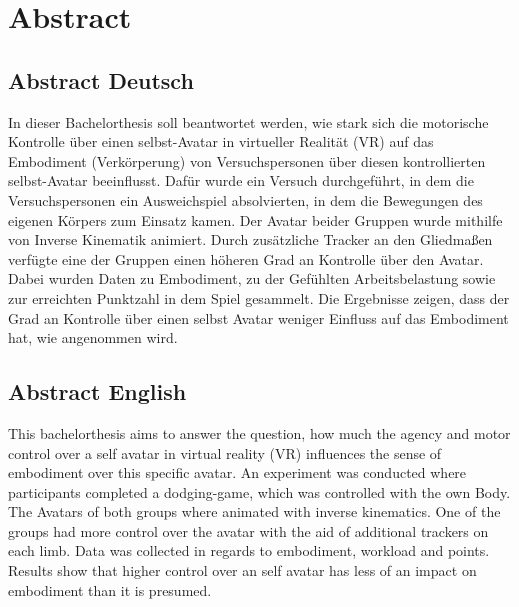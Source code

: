 \chapter*{Abstract}

\section*{Abstract Deutsch}
In dieser Bachelorthesis soll beantwortet werden, wie stark sich die motorische Kontrolle über einen selbst-Avatar in virtueller Realität (VR) auf das Embodiment (Verkörperung) von Versuchspersonen über diesen kontrollierten selbst-Avatar beeinflusst. Dafür wurde ein Versuch durchgeführt, in dem die Versuchspersonen ein Ausweichspiel absolvierten, in dem die Bewegungen des eigenen Körpers zum Einsatz kamen. Der Avatar beider Gruppen wurde mithilfe von Inverse Kinematik animiert. Durch zusätzliche Tracker an den Gliedmaßen verfügte eine der Gruppen einen höheren Grad an Kontrolle über den Avatar. Dabei wurden Daten zu Embodiment, zu der Gefühlten Arbeitsbelastung sowie zur erreichten Punktzahl in dem Spiel gesammelt. Die Ergebnisse zeigen, dass der Grad an Kontrolle über einen selbst Avatar weniger Einfluss auf das Embodiment hat, wie angenommen wird.


\section*{Abstract English}
This bachelorthesis aims to answer the question, how much the agency and motor control over a self avatar in virtual reality (VR) influences the sense of embodiment over this specific avatar. An experiment was conducted where participants completed a dodging-game, which was controlled with the own Body. The Avatars of both groups where animated with inverse kinematics. One of the groups had more control over the avatar with the aid of additional trackers on each limb. Data was collected in regards to embodiment, workload and points. Results show that higher control over an self avatar has less of an impact on embodiment than it is presumed.